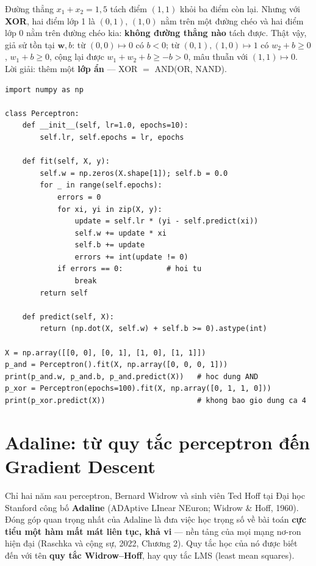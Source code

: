 Đường thẳng $x_1 + x_2 = 1{,}5$ tách điểm $(1, 1)$ khỏi ba điểm còn lại. Nhưng với \textbf{XOR}, hai điểm lớp 1 là $(0, 1)$, $(1, 0)$ nằm trên một đường chéo và hai điểm lớp 0 nằm trên đường chéo kia: \textbf{không đường thẳng nào} tách được. Thật vậy, giả sử tồn tại $\mathbf{w}, b$: từ $(0, 0) \mapsto 0$ có $b < 0$; từ $(0, 1), (1, 0) \mapsto 1$ có $w_2 + b \geq 0$, $w_1 + b \geq 0$, cộng lại được $w_1 + w_2 + b \geq -b > 0$, mâu thuẫn với $(1, 1) \mapsto 0$. Lời giải: thêm một \textbf{lớp ẩn} --- XOR $= $ AND(OR, NAND).

\begin{lstlisting}[caption={Cài đặt perceptron từ đầu}]
import numpy as np

class Perceptron:
    def __init__(self, lr=1.0, epochs=10):
        self.lr, self.epochs = lr, epochs

    def fit(self, X, y):
        self.w = np.zeros(X.shape[1]); self.b = 0.0
        for _ in range(self.epochs):
            errors = 0
            for xi, yi in zip(X, y):
                update = self.lr * (yi - self.predict(xi))
                self.w += update * xi
                self.b += update
                errors += int(update != 0)
            if errors == 0:          # hoi tu
                break
        return self

    def predict(self, X):
        return (np.dot(X, self.w) + self.b >= 0).astype(int)

X = np.array([[0, 0], [0, 1], [1, 0], [1, 1]])
p_and = Perceptron().fit(X, np.array([0, 0, 0, 1]))
print(p_and.w, p_and.b, p_and.predict(X))   # hoc dung AND
p_xor = Perceptron(epochs=100).fit(X, np.array([0, 1, 1, 0]))
print(p_xor.predict(X))                     # khong bao gio dung ca 4
\end{lstlisting}

\section{Adaline: từ quy tắc perceptron đến Gradient Descent}
\label{sec:adaline}

Chỉ hai năm sau perceptron, Bernard Widrow và sinh viên Ted Hoff tại Đại học Stanford công bố \textbf{Adaline} (ADAptive LInear NEuron; Widrow \& Hoff, 1960). Đóng góp quan trọng nhất của Adaline là đưa việc học trọng số về bài toán \textbf{cực tiểu một hàm mất mát liên tục, khả vi} --- nền tảng của mọi mạng nơ-ron hiện đại (Raschka và cộng sự, 2022, Chương 2). Quy tắc học của nó được biết đến với tên \textbf{quy tắc Widrow--Hoff}, hay quy tắc LMS (least mean squares).


